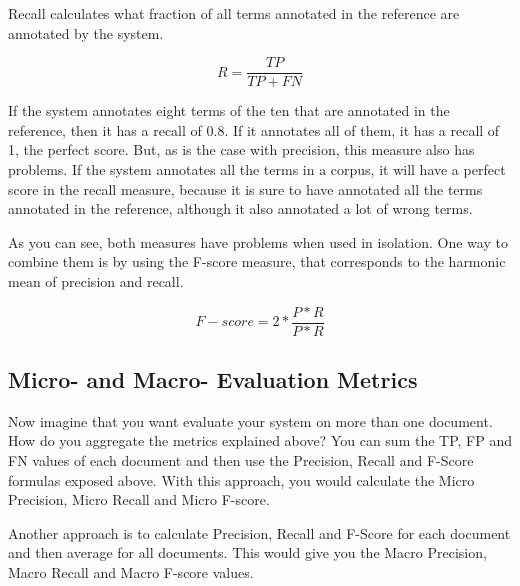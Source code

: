 Recall calculates what fraction of all terms annotated in the reference are annotated by the system.

\begin{equation}
R = \frac{TP}{TP+FN}
\end{equation}

If the system annotates eight terms of the ten that are annotated in the reference, then it has a recall of 0.8. If it annotates all of them, it has a recall of 1, the perfect score. But, as is the case with precision, this measure also has problems. If the system annotates all the terms in a corpus, it will have a perfect score in the recall measure, because it is sure to have annotated all the terms annotated in the reference, although it also annotated a lot of wrong terms.

As you can see, both measures have problems when used in isolation. One way to combine them is by using the F-score measure, that corresponds to the harmonic mean of precision and recall.

\begin{equation}
F−score = 2 * \frac{P*R}{P*R}
\end{equation}

\subsection{Micro- and Macro- Evaluation Metrics}

Now imagine that you want evaluate your system on more than one document. How do you aggregate the metrics explained above? You can sum the TP, FP and FN values of each document and then use the Precision, Recall and F-Score formulas exposed above. With this approach, you would calculate the Micro Precision, Micro Recall and Micro F-score.

Another approach is to calculate Precision, Recall and F-Score for each document and then average for all documents. This would give you the Macro Precision, Macro Recall and Macro F-score values.


